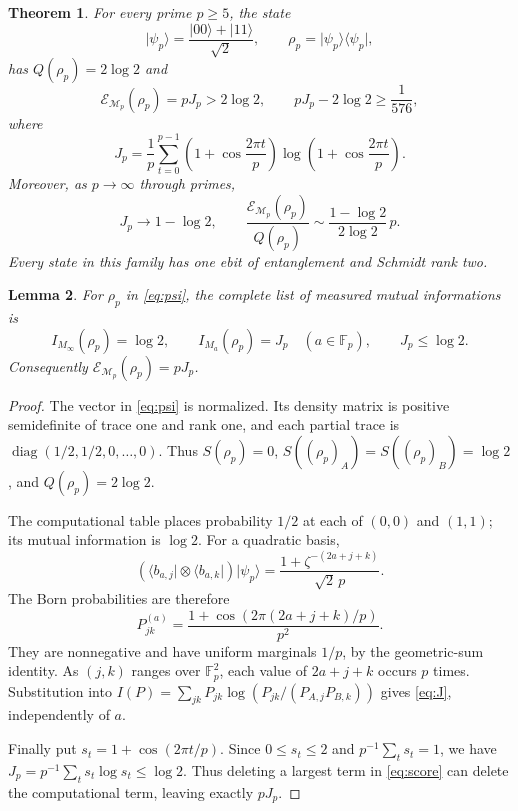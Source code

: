\documentclass[11pt]{article}
\newtheorem{theorem}{Theorem}[section]
\newtheorem{lemma}[theorem]{Lemma}
\theoremstyle{remark}
\newcommand{\F}{\mathbb F}
\newcommand{\E}{\mathcal E}
\newcommand{\M}{\mathcal M}
\newcommand{\ket}[1]{\lvert #1\rangle}
\newcommand{\bra}[1]{\langle #1\rvert}
\begin{document}
\begin{theorem}\label{thm:main}
For every prime $p\geq5$, the state
\begin{equation}\label{eq:psi}
 \ket{\psi_p}=\frac{\ket{00}+\ket{11}}{\sqrt2},\qquad
 \rho_p=\ket{\psi_p}\bra{\psi_p},
\end{equation}
has $Q(\rho_p)=2\log2$ and
\begin{equation}\label{eq:main}
 \E_{\M_p}(\rho_p)=pJ_p>2\log2,
 \qquad pJ_p-2\log2\geq\frac1{576},
\end{equation}
where
\begin{equation}\label{eq:J}
 J_p=\frac1p\sum_{t=0}^{p-1}
 \left(1+\cos\frac{2\pi t}{p}\right)
 \log\left(1+\cos\frac{2\pi t}{p}\right).
\end{equation}
Moreover, as $p\to\infty$ through primes,
\begin{equation}\label{eq:limit}
 J_p\longrightarrow1-\log2,\qquad
 \frac{\E_{\M_p}(\rho_p)}{Q(\rho_p)}
 \sim\frac{1-\log2}{2\log2}\,p.
\end{equation}
Every state in this family has one ebit of entanglement and Schmidt rank two.
\end{theorem}
\begin{lemma}\label{lem:laws}
For $\rho_p$ in \eqref{eq:psi}, the complete list of measured mutual informations is
\[
 I_{M_\infty}(\rho_p)=\log2,\qquad
 I_{M_a}(\rho_p)=J_p\quad(a\in\F_p),
 \qquad J_p\leq\log2.
\]
Consequently $\E_{\M_p}(\rho_p)=pJ_p$.
\end{lemma}
\begin{proof}
The vector in \eqref{eq:psi} is normalized. Its density matrix is positive semidefinite of trace one and rank one, and each partial trace is
$\operatorname{diag}(1/2,1/2,0,\ldots,0)$. Thus $S(\rho_p)=0$, $S((\rho_p)_A)=S((\rho_p)_B)=\log2$, and $Q(\rho_p)=2\log2$.

The computational table places probability $1/2$ at each of $(0,0)$ and $(1,1)$; its mutual information is $\log2$. For a quadratic basis,
\[
 (\bra{b_{a,j}}\otimes\bra{b_{a,k}})\ket{\psi_p}
 =\frac{1+\zeta^{-(2a+j+k)}}{\sqrt2\,p}.
\]
The Born probabilities are therefore
\begin{equation}\label{eq:belltable}
 P^{(a)}_{jk}=\frac{1+\cos(2\pi(2a+j+k)/p)}{p^2}.
\end{equation}
They are nonnegative and have uniform marginals $1/p$, by the geometric-sum identity. As $(j,k)$ ranges over $\F_p^2$, each value of $2a+j+k$ occurs $p$ times. Substitution into
$I(P)=\sum_{jk}P_{jk}\log(P_{jk}/(P_{A,j}P_{B,k}))$
gives \eqref{eq:J}, independently of $a$.

Finally put $s_t=1+\cos(2\pi t/p)$. Since $0\leq s_t\leq2$ and $p^{-1}\sum_t s_t=1$, we have
$J_p=p^{-1}\sum_t s_t\log s_t\leq\log2$.
Thus deleting a largest term in \eqref{eq:score} can delete the computational term, leaving exactly $pJ_p$.
\end{proof}
\end{document}
